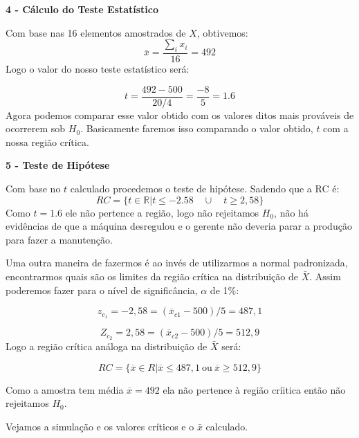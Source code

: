 \documentclass[
  letterpaper,
  DIV=11,
  numbers=noendperiod]{scrartcl}
\begin{document}
\vspace{0.5cm}

\textbf{4 - Cálculo do Teste Estatístico}

Com base nas 16 elementos amostrados de \(X\), obtivemos:
\[\bar{x}=\frac{\sum_i{x_i}}{16}=492\] Logo o valor do nosso teste
estatístico será:

\[t=\frac{492-500}{20/4}=\frac{-8}{5}=1.6\] Agora podemos comparar esse
valor obtido com os valores ditos mais prováveis de ocorrerem sob
\(H_0\). Basicamente faremos isso comparando o valor obtido, \(t\) com a
nossa região crítica.

\vspace{0.5cm}

\textbf{5 - Teste de Hipótese}

Com base no \(t\) calculado procedemos o teste de hipótese. Sadendo que
a RC é:
\[RC= \{ t \in \mathbb{R}| t\leq -2.58 \quad \cup \quad t\geq 2,58 \}\]
Como \(t=1.6\) ele não pertence a região, logo não rejeitamos \(H_0\),
não há evidências de que a máquina desregulou e o gerente não deveria
parar a produção para fazer a manutenção.

Uma outra maneira de fazermos é ao invés de utilizarmos a normal
padronizada, encontrarmos quais são os limites da região crítica na
distribuição de \(\bar{X}\). Assim poderemos fazer para o nível de
significância, \(\alpha\) de 1\%:

\[z_{c_1}=-2,58=(\overline{x}_{c1}-500)/5=487,1\]

\[Z_{c_2}=2,58=(\overline{x}_{c2}-500)/5=512,9\] Logo a região crítica
análoga na distribuição de \(\bar{X}\) será:

\[RC=\{\overline{x} \in R | \overline{x} \leq 487,1 \ \text{ou} \  \overline{x}\geq512,9  \}\]

Como a amostra tem média \(\overline{x}=492\) ela não pertence à região
críitica então não rejeitamos \(H_0\).

Vejamos a simulação e os valores críticos e o \(\bar{x}\) calculado.

\vspace{0.5cm}
\end{document}
